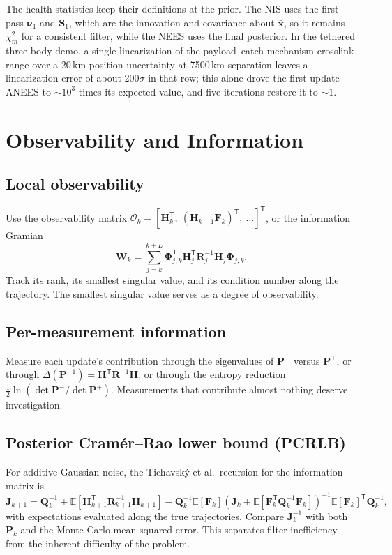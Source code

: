 \documentclass[11pt]{article}
\newcommand{\x}{\bm{x}}
\newcommand{\Pm}{\bm{P}}
\newcommand{\Sm}{\bm{S}}
\newcommand{\Hm}{\bm{H}}
\newcommand{\Fm}{\bm{F}}
\newcommand{\Qm}{\bm{Q}}
\newcommand{\Rm}{\bm{R}}
\newcommand{\Phim}{\bm{\Phi}}
\newcommand{\Jm}{\bm{J}}
\newcommand{\T}{^{\mathsf{T}}}
\newcommand{\E}{\mathbb{E}}
\begin{document}
The health statistics keep their definitions at the prior. The NIS uses the first-pass
$\bm{\nu}_1$ and $\Sm_1$, which are the innovation and covariance about $\bar{\x}$, so it
remains $\chi^2_m$ for a consistent filter, while the NEES uses the final posterior. In
the tethered three-body demo, a single linearization of the payload--catch-mechanism
crosslink range over a 20\,km position uncertainty at 7500\,km separation leaves a
linearization error of about $200\sigma$ in that row; this alone drove the first-update
ANEES to $\sim\!10^3$ times its expected value, and five iterations restore it to $\sim\!1$.

\section{Observability and Information}
\label{sec:observability}

\subsection{Local observability}
Use the observability matrix
$\mathcal{O}_k = [\Hm_k\T,\ (\Hm_{k+1}\Fm_k)\T,\ \dots]\T$, or the information Gramian
\begin{equation}
  \bm{W}_k = \sum_{j=k}^{k+L}\Phim_{j,k}\T \Hm_j\T \Rm_j^{-1}\Hm_j \Phim_{j,k}.
\end{equation}
Track its rank, its smallest singular value, and its condition number along the trajectory.
The smallest singular value serves as a degree of observability.

\subsection{Per-measurement information}
Measure each update's contribution through the eigenvalues of $\Pm^-$ versus $\Pm^+$, or
through $\Delta(\Pm^{-1}) = \Hm\T\Rm^{-1}\Hm$, or through the entropy reduction
$\tfrac12\ln(\det\Pm^-/\det\Pm^+)$. Measurements that contribute almost nothing deserve
investigation.

\subsection{Posterior Cram\'er--Rao lower bound (PCRLB)}
For additive Gaussian noise, the Tichavsk\'y et al.\ recursion for the information
matrix is
\begin{equation}
  \Jm_{k+1} = \Qm_k^{-1} + \E\!\left[\Hm_{k+1}\T\Rm_{k+1}^{-1}\Hm_{k+1}\right]
  - \Qm_k^{-1}\E[\Fm_k]\left(\Jm_k + \E\!\left[\Fm_k\T\Qm_k^{-1}\Fm_k\right]\right)^{-1}
  \E[\Fm_k]\T\Qm_k^{-1},
\end{equation}
with expectations evaluated along the true trajectories. Compare $\Jm_k^{-1}$ with both
$\Pm_k$ and the Monte Carlo mean-squared error. This separates filter inefficiency from
the inherent difficulty of the problem.
\end{document}
